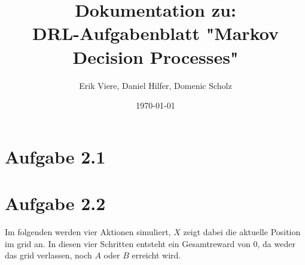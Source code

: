 \documentclass[11pt]{article}
\title{\textbf{Dokumentation zu:\\DRL-Aufgabenblatt "Markov Decision Processes"}}
\author{Erik Viere, Daniel Hilfer, Domenic Scholz}
\date{\today}
\begin{document}
\maketitle	
\pagebreak

\section*{Aufgabe 2.1}
\section*{Aufgabe 2.2}

Im folgenden werden vier Aktionen simuliert, $X$ zeigt dabei die aktuelle Position im grid an.
In diesen vier Schritten entsteht ein Gesamtreward von $0$, da weder das grid verlassen, noch $A$ oder $B$ erreicht wird.
\end{document}
